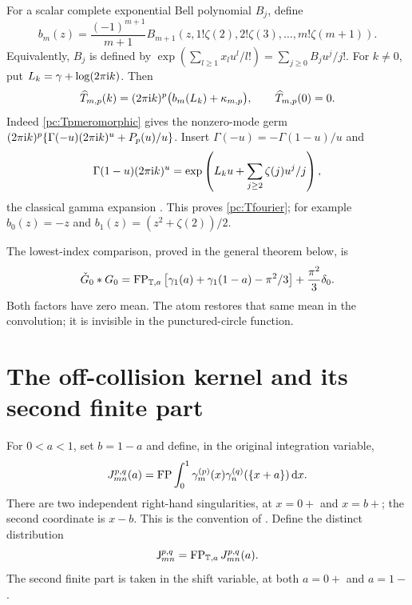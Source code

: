 For a scalar complete exponential Bell polynomial $B_j$, define
\begin{equation}\label{pc:bell}
 b_m(z)=\frac{(-1)^{m+1}}{m+1}
 B_{m+1}(z,1!\zeta(2),2!\zeta(3),\ldots,m!\zeta(m+1)).
\end{equation}
Equivalently, $B_j$ is defined by
$\exp(\sum_{l\ge1}x_lu^l/l!)=\sum_{j\ge0}B_ju^j/j!$.
For $k\ne0$, put $L_k=\gamma+\log(2\pi\mathrm{i} k)$. Then
\begin{equation}\label{pc:Tfourier}
 \widehat T_{m,p}(k)=(2\pi\mathrm{i} k)^p
             \bigl(b_m(L_k)+\kappa_{m,p}\bigr),\qquad
 \widehat T_{m,p}(0)=0.
\end{equation}
Indeed \eqref{pc:Tpmeromorphic} gives the nonzero-mode germ
$(2\pi\mathrm{i} k)^p\{\Gamma(-u)(2\pi\mathrm{i} k)^u+P_p(u)/u\}$.
Insert $\Gamma(-u)=-\Gamma(1-u)/u$ and
\[
 \Gamma(1-u)(2\pi\mathrm{i} k)^u
 =\exp\left(L_ku+\sum_{j\ge2}\zeta(j)u^j/j\right),
\]
the classical gamma expansion \cite{pcc:DLMFGamma}. This proves
\eqref{pc:Tfourier}; for example $b_0(z)=-z$ and
$b_1(z)=(z^2+\zeta(2))/2$.

The lowest-index comparison, proved in the general theorem below, is
\begin{equation}\label{pc:preview}
 \check G_0*G_0
 =\operatorname{FP}_{\mathbb T,a}\left[\gamma_1(a)+\gamma_1(1-a)-\pi^2/3\right]
       +\frac{\pi^2}{3}\delta_0.
\end{equation}
Both factors have zero mean. The atom restores that same mean in the
convolution; it is invisible in the punctured-circle function.
\section{The off-collision kernel and its second finite part}\label{pc:offpoint}
For $0<a<1$, set $b=1-a$ and define, in the original integration variable,
\begin{equation}\label{pc:Jpoint}
 J_{mn}^{p,q}(a)=\operatorname{FP}\int_0^1
 \gamma_m^{(p)}(x)\gamma_n^{(q)}(\{x+a\})\,\mathrm d x.
\end{equation}
There are two independent right-hand singularities, at $x=0+$ and $x=b+$; the second coordinate is $x-b$. This is the convention of \cite{pcc:reports}. Define the distinct distribution
\begin{equation}\label{pc:Jdistribution}
 \mathsf J_{mn}^{p,q}=\operatorname{FP}_{\mathbb T,a}J_{mn}^{p,q}(a).
\end{equation}
The second finite part is taken in the shift variable, at both $a=0+$ and $a=1-$.

